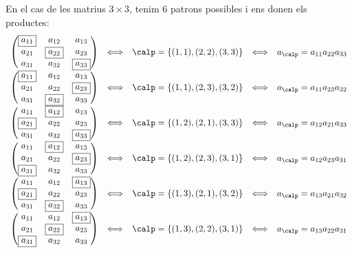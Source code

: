 \begin{exemple}
    En el cas de les matrius $3\times 3$, tenim $6$ patrons possibles i ens donen els productes:
    $$
    \begin{array}{ccccc}
\begin{pmatrix} \boxed{a_{11}} & a_{12} & a_{13}\\ a_{21} & \boxed{a_{22}} & a_{23}\\ a_{31} & a_{32} & \boxed{a_{33}} \end{pmatrix} & \Longleftrightarrow & \calp=\{(1,1),(2,2),(3,3)\} &   \Longleftrightarrow & a_\calp=a_{11}a_{22}a_{33} \\
\begin{pmatrix} \boxed{a_{11}} & a_{12} & a_{13}\\ a_{21} & a_{22} & \boxed{a_{23}}\\ a_{31} & \boxed{a_{32}} & a_{33} \end{pmatrix} & \Longleftrightarrow & \calp=\{(1,1),(2,3),(3,2)\} &   \Longleftrightarrow & a_\calp=a_{11}a_{23}a_{32} \\
\begin{pmatrix} a_{11} & \boxed{a_{12}} & a_{13}\\ \boxed{a_{21}} & a_{22} & a_{23}\\ a_{31} & a_{32} & \boxed{a_{33}} \end{pmatrix} & \Longleftrightarrow & \calp=\{(1,2),(2,1),(3,3)\} &   \Longleftrightarrow & a_\calp=a_{12}a_{21}a_{33} \\
\begin{pmatrix} a_{11} & \boxed{a_{12}} & a_{13}\\ a_{21} & a_{22} & \boxed{a_{23}}\\ \boxed{a_{31}} & a_{32} & a_{33} \end{pmatrix} & \Longleftrightarrow & \calp=\{(1,2),(2,3),(3,1)\} &   \Longleftrightarrow & a_\calp=a_{12}a_{23}a_{31} \\
\begin{pmatrix} a_{11} & a_{12} & \boxed{a_{13}}\\ \boxed{a_{21}} & a_{22} & a_{23}\\ a_{31} & \boxed{a_{32}} & a_{33} \end{pmatrix} & \Longleftrightarrow & \calp=\{(1,3),(2,1),(3,2)\} &   \Longleftrightarrow & a_\calp=a_{13}a_{21}a_{32} \\
\begin{pmatrix} a_{11} & a_{12} & \boxed{a_{13}}\\ a_{21} & \boxed{a_{22}} & a_{23}\\ \boxed{a_{31}} & a_{32} & a_{33} \end{pmatrix} & \Longleftrightarrow & \calp=\{(1,3),(2,2),(3,1)\} &   \Longleftrightarrow & a_\calp=a_{13}a_{22}a_{31} 
    \end{array}
    $$
\end{exemple}
